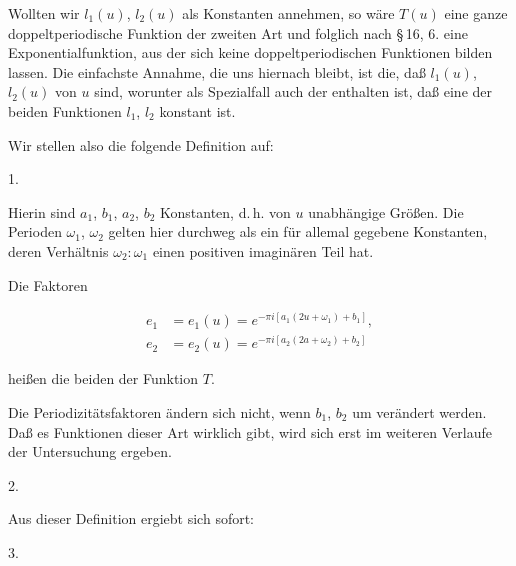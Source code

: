 
Wollten wir $l_1(u)$, $l_2(u)$ als Konstanten annehmen, so wäre $T(u)$ eine ganze doppeltperiodische Funktion der zweiten Art und folglich nach \S\,16, 6. eine Exponentialfunktion, aus der sich keine doppeltperiodischen Funktionen bilden lassen. Die einfachste Annahme, die uns hiernach bleibt, ist die, daß $l_1(u)$, $l_2(u)$  von $u$ sind, worunter als Spezialfall auch der enthalten ist, daß eine der beiden Funktionen $l_1$, $l_2$ konstant ist.

Wir stellen also die folgende Definition auf:

1. 


Hierin sind $a_1$, $b_1$, $a_2$, $b_2$ Konstanten, d.\,h. von $u$ unabhängige Größen. Die Perioden $\omega_1$, $\omega_2$ gelten hier durchweg als ein für allemal gegebene Konstanten, deren Verhältnis $\omega_2:\omega_1$ einen positiven imaginären Teil hat.

Die Faktoren

\[
\begin{aligned}
e_1 &= e_1(u) = e^{-\pi i [a_1(2u+\omega_1)+b_1]},\\
e_2 &= e_2(u) = e^{-\pi i [a_2(2a+\omega_2)+b_2]}
\end{aligned}
\]

heißen die beiden  der Funktion $T$.

Die Periodizitätsfaktoren ändern sich nicht, wenn $b_1$, $b_2$ um  verändert werden. Daß es Funktionen dieser Art wirklich gibt, wird sich erst im weiteren Verlaufe der Untersuchung ergeben.

2. 

Aus dieser Definition ergiebt sich sofort:

3. 
